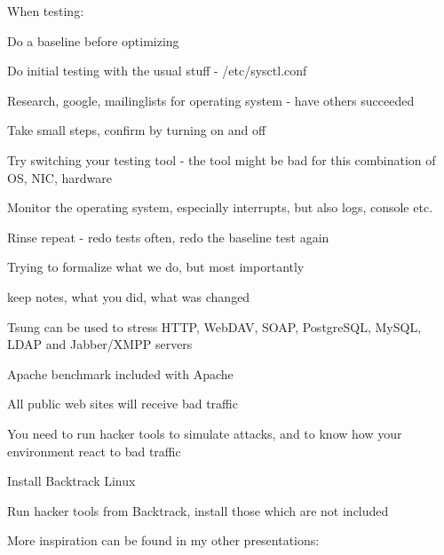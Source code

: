 \documentclass[20pt,landscape,a4paper,footrule]{foils}
\begin{document}
\begin{list1}
\item When testing:
\begin{list2}
\item Do a baseline before optimizing
\item Do initial testing with the usual stuff - /etc/sysctl.conf
\item Research, google, mailinglists for operating system - have others succeeded
\item Take small steps, confirm by turning on and off
\item Try switching your testing tool - the tool might be bad for this combination of OS, NIC, hardware
\item Monitor the operating system, especially interrupts, but also logs, console etc.
\end{list2}
\item Rinse repeat - redo tests often, redo the baseline test again
\end{list1}

Trying to formalize what we do, but most importantly

keep notes, what you did, what was changed




\begin{list1}
\item Tsung can be used to stress HTTP, WebDAV, SOAP, PostgreSQL, MySQL, LDAP and Jabber/XMPP servers 
\item Apache benchmark included with Apache
\end{list1}


\begin{list1}
\item All public web sites will receive bad traffic
\item You need to run hacker tools to simulate attacks, and to know how your environment react to bad traffic
\item Install Backtrack Linux 
\item Run hacker tools from Backtrack, install those which are not included
\item More inspiration can be found in my other presentations:\\
\\
\end{list1}
\end{document}
